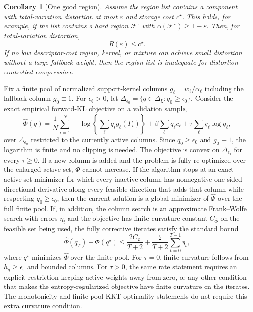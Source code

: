 \documentclass[twoside,11pt]{article}
\newtheorem{corollary}{Corollary}
\newcommand{\F}{\mathcal{F}}
\begin{document}
\begin{corollary}[One good region]
\label{cor:dictionaryoracle}
Assume the region list contains a component with total-variation distortion at most \(\varepsilon\) and storage cost \(c^\star\). This holds, for example, if the list contains a hard region \(\F^\star\) with \(\alpha(\F^\star)\ge1-\varepsilon\). Then, for total-variation distortion,
\[
R(\varepsilon)\le c^\star.
\]
If no low descriptor-cost region, kernel, or mixture can achieve small distortion without a large fallback weight, then the region list is inadequate for distortion-controlled compression.
\end{corollary}

\begin{theorem}
\label{thm:columngeneration}
Fix a finite pool of normalized support-kernel columns \(g_\ell=w_\ell/\alpha_\ell\) including the fallback column \(g_0\equiv1\). For \(\epsilon_0>0\), let \(\Delta_{\epsilon_0}=\{q\in\Delta_L:q_0\ge\epsilon_0\}\). Consider the exact empirical forward-KL objective on a validation sample,
\[
\widehat\Phi(q)=\frac1N\sum_{i=1}^N-\log\!\left\{\sum_{\ell}q_\ell g_\ell(\Gamma_i)\right\}+\beta\sum_\ell q_\ell c_\ell+\tau\sum_\ell q_\ell\log q_\ell ,
\]
over \(\Delta_{\epsilon_0}\) restricted to the currently active columns. Since \(q_0\ge\epsilon_0\) and \(g_0\equiv1\), the logarithm is finite and no clipping is needed. The objective is convex on \(\Delta_{\epsilon_0}\) for every \(\tau\ge0\). If a new column is added and the problem is fully re-optimized over the enlarged active set, \(\widehat\Phi\) cannot increase. If the algorithm stops at an exact active-set minimizer for which every inactive column has nonnegative one-sided directional derivative along every feasible direction that adds that column while respecting \(q_0\ge\epsilon_0\), then the current solution is a global minimizer of \(\widehat\Phi\) over the full finite pool. If, in addition, the column search is an approximate Frank--Wolfe search with errors \(\eta_t\) and the objective has finite curvature constant \(C_{\widehat\Phi}\) on the feasible set being used, the fully corrective iterates satisfy the standard bound
\[
\widehat\Phi(q_T)-\widehat\Phi(q^\star) \le \frac{2C_{\widehat\Phi}}{T+2} + \frac{2}{T+2}\sum_{t=0}^{T-1}\eta_t,
\]
where $q^\star$ minimizes $\widehat\Phi$ over the finite pool. For $\tau=0$, finite curvature follows from $h_q\ge\epsilon_0$ and bounded columns. For $\tau>0$, the same rate statement requires an explicit restriction keeping active weights away from zero, or any other condition that makes the entropy-regularized objective have finite curvature on the iterates. The monotonicity and finite-pool KKT optimality statements do not require this extra curvature condition.
\end{theorem}
\end{document}
